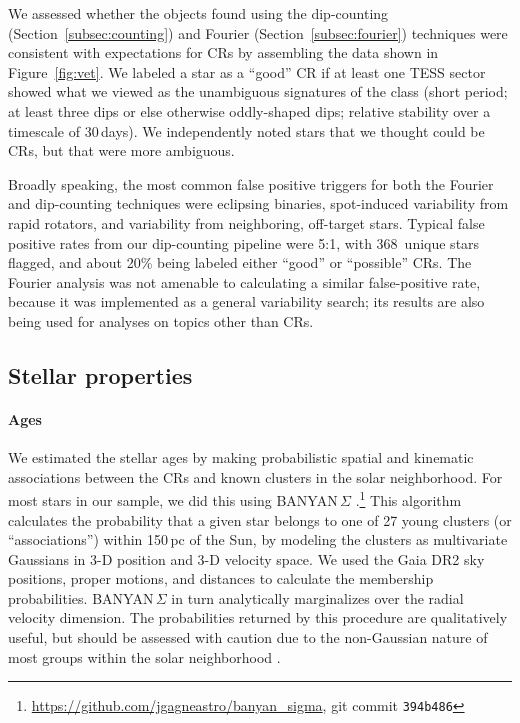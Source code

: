 \documentclass[11pt,twocolumn,tighten]{aastex63}
\newcommand{\nuniqdipflagged}{{368}} %
\begin{document}
We assessed whether the objects found using the dip-counting
(Section~\ref{subsec:counting}) and Fourier
(Section~\ref{subsec:fourier}) techniques were consistent with
expectations for CRs by assembling the data shown in
Figure~\ref{fig:vet}.  We labeled a star as a ``good'' CR if at least
one TESS sector showed what we viewed as the unambiguous signatures of
the class (short period; at least three dips or else otherwise
oddly-shaped dips; relative stability over a timescale of 30\,days).
We independently noted stars that we thought could be CRs, but that
were more ambiguous.

Broadly speaking, the most common false positive triggers for both the Fourier
and dip-counting techniques were eclipsing binaries, spot-induced
variability from rapid rotators, and variability from neighboring,
off-target stars.  Typical false positive rates from our dip-counting
pipeline were 5:1, with \nuniqdipflagged\ unique stars flagged, and
about 20\% being labeled either ``good'' or ``possible'' CRs.  The
Fourier analysis was not amenable to calculating a similar
false-positive rate, because it was implemented as a general
variability search; its results are also being used for analyses on
topics other than CRs.


\subsection{Stellar properties}
\label{subsec:starprops}

\paragraph{Ages}
We estimated the stellar ages by making probabilistic spatial and
kinematic associations between the CRs and known clusters in the
solar neighborhood.  For most stars in our sample, we did this using
BANYAN\,$\Sigma$
\citep{2018ApJ...856...23G}.\footnote{\url{https://github.com/jgagneastro/banyan_sigma},
git commit \texttt{394b486}} This algorithm calculates the probability
that a given star belongs to one of 27 young clusters (or
``associations'') within 150\,pc of the Sun, by modeling the clusters
as multivariate Gaussians in 3-D position and 3-D velocity space.  We
used the Gaia DR2 sky positions, proper motions, and distances to
calculate the membership probabilities.  BANYAN\,$\Sigma$ in turn
analytically marginalizes over the radial velocity dimension.  The
probabilities returned by this procedure are qualitatively useful, but
should be assessed with caution due to the non-Gaussian nature of most
groups within the solar neighborhood \citep[see
e.g.][Figure~10]{2021ApJ...917...23K}.
\end{document}
